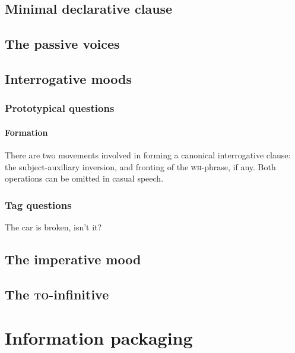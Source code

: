 \documentclass[UTF8, a4paper, oneside, scheme=plain]{ctexrep}
\newcommand{\corpuscat}[1]{\textsc{#1}}
\begin{document}
\section{Minimal declarative clause}

\section{The passive voices}\label{sec:simple-clause.voice}


\section{Interrogative moods}

\subsection{Prototypical questions}

\subsubsection{Formation}\label{sec:simple-clause.interrogative.formation}

There are two movements involved in forming a canonical interrogative clause:
the subject-auxiliary inversion,
and fronting of the \corpuscat{wh}-phrase, if any.
Both operations can be omitted in casual speech.

\subsection{Tag questions}

\begin{exe}
    \ex The car is broken, isn't it?
\end{exe}

\section{The imperative mood}

\section{The \corpuscat{to}-infinitive}

\chapter{Information packaging}\label{chap:information-packaging}
\end{document}
